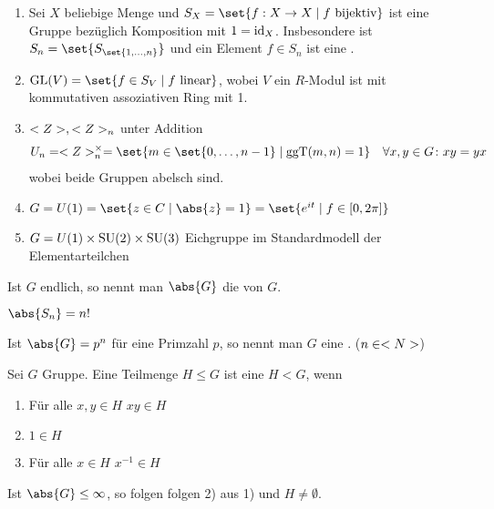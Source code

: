 \begin{example}
	\begin{enumerate}
		\item Sei $X$ beliebige Menge und $S_X = \set{f: X \to X \mid f \text{ bijektiv}}$ ist eine Gruppe bezüglich Komposition mit $1 = \operatorname{id}_X$. Insbesondere ist $S_n = \set{S_{\set{1,\dots,n}}}$  und ein Element $f \in S_n$ ist eine .
		\item $\GL(V) = \set{f \in S_V \mid f \text{ linear}}$, wobei $V$ ein $R$-Modul ist mit kommutativen assoziativen Ring mit 1.
		\item $<Z>, <Z>_n$ unter Addition 
		\begin{align*}
			U_n = \Z^{\times}_n = \set{ m \in \set{0,\dots,n-1} \mid \ggT(m,n) = 1}\quad \forall x,y \in G \colon xy = yx
		\end{align*}
		wobei beide Gruppen abelsch sind.
		\item $G = U(1) = \set{z \in C \mid \abs{z} = 1} = \set{e^{it}\mid f \in [0,2\pi]}$
		\item $G = U(1) \times \operatorname{SU}(2)\times \operatorname{SU}(3)$ Eichgruppe im Standardmodell der Elementarteilchen  
	\end{enumerate}
\end{example}
\begin{definition}[Ordnung]
	Ist $G$ endlich, so nennt man $\abs{G}$ die  von $G$.
\end{definition}
\begin{example}
	$\abs{S_n} = n!$
\end{example}
\begin{definition}[$p$-Gruppe]
	Ist $\abs{G} = p^n$ für eine Primzahl $p$, so nennt man $G$ eine . ($n \in <N>$)
\end{definition}
\begin{definition}[Untergruppe]
	Sei $G$ Gruppe. Eine Teilmenge $H \le G$ ist eine  $H < G$, wenn
	\begin{enumerate}
		\item Für alle $x,y \in H$ $xy \in H$
		\item $1 \in H$
		\item Für alle $x \in H$ $x^{-1} \in H$ 
	\end{enumerate}
\end{definition}
\begin{proposition}
	Ist $\abs{G} \le \infty$, so folgen folgen 2) aus 1)  und $H \neq \emptyset$. %
\end{proposition}
